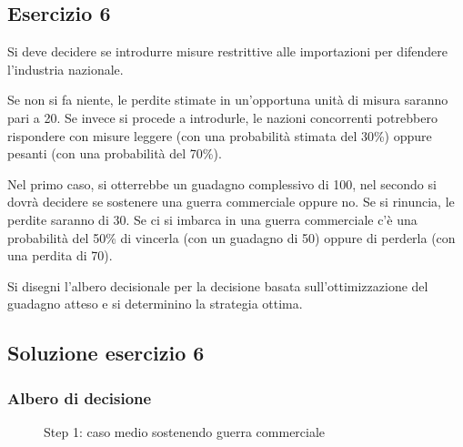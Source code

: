 \documentclass[\main/main.tex]{subfiles}
\begin{document}
\subsection{Esercizio 6}
Si deve decidere se introdurre misure restrittive alle importazioni per difendere l'industria nazionale.

Se non si fa niente, le perdite stimate in un'opportuna unità di misura saranno pari a 20. Se invece si procede a introdurle, le nazioni concorrenti potrebbero rispondere con misure leggere (con una probabilità stimata del 30\%) oppure pesanti (con una probabilità del 70\%).

Nel primo caso, si otterrebbe un guadagno complessivo di 100, nel secondo si dovrà decidere se sostenere una guerra commerciale oppure no. Se si rinuncia, le perdite saranno di 30. Se ci si imbarca in una guerra commerciale c'è una probabilità del 50\% di vincerla (con un guadagno di 50) oppure di perderla (con una perdita di 70).

Si disegni l'albero decisionale per la decisione basata sull'ottimizzazione del guadagno atteso e si determinino la strategia ottima.

\subsection{Soluzione esercizio 6}

\subsubsection*{Albero di decisione}
\begin{figure}
\end{figure}

\begin{figure}
  \caption{Step 1: caso medio sostenendo guerra commerciale}
\end{figure}
\end{document}
